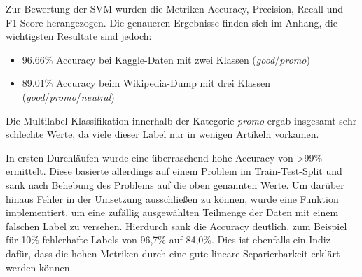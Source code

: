 Zur Bewertung der SVM wurden die Metriken Accuracy, Precision, Recall und F1-Score herangezogen. Die genaueren Ergebnisse finden sich im Anhang, die wichtigsten Resultate sind jedoch:

\begin{itemize}
    \item 96.66\% Accuracy bei Kaggle-Daten mit zwei Klassen (\textit{good}/\textit{promo})
    \item 89.01\% Accuracy beim Wikipedia-Dump mit drei Klassen (\textit{good}/\textit{promo}/\textit{neutral})
\end{itemize}

Die Multilabel-Klassifikation innerhalb der Kategorie \textit{promo} ergab insgesamt sehr schlechte Werte, da viele dieser Label nur in wenigen Artikeln vorkamen.

In ersten Durchläufen wurde eine überraschend hohe Accuracy von >99\% ermittelt. Diese basierte allerdings auf einem Problem im Train-Test-Split und sank nach Behebung des Problems auf die oben genannten Werte. Um darüber hinaus Fehler in der Umsetzung ausschließen zu können, wurde eine Funktion implementiert, um eine zufällig ausgewählten Teilmenge der Daten mit einem falschen Label zu versehen. Hierdurch sank die Accuracy deutlich, zum Beispiel für 10\% fehlerhafte Labels von 96,7\% auf 84,0\%. Dies ist ebenfalls ein Indiz dafür, dass die hohen Metriken durch eine gute lineare Separierbarkeit erklärt werden können.
